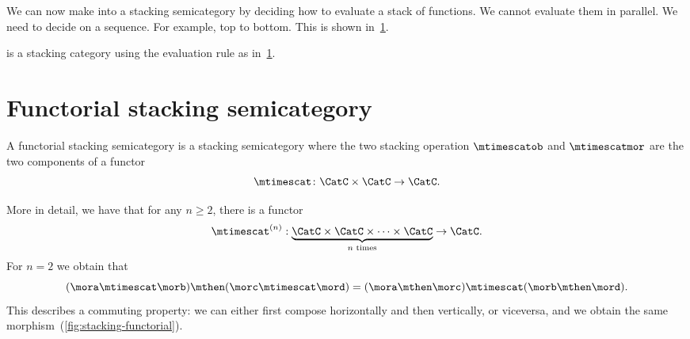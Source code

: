 We can now make \Effects into a stacking semicategory by deciding how to evaluate a stack of functions.
We cannot evaluate them in parallel.
We need to decide on a sequence.
For example, top to bottom.
This is shown in~\cref{fig:effect-stacking}.

\begin{lemma}
    \label{lem:effects-is-stacking}
    \Effects is a stacking category using the evaluation rule as in~\cref{fig:effect-stacking}.
\end{lemma}

\begin{figure}[h!]
    \centering
    \caption{}
    \label{fig:effect-stacking}
\end{figure}


\section{Functorial stacking semicategory}

\begin{ctdefinition}
    \label{def:functorial-stacking-semi-cat}
    A functorial stacking semicategory is a stacking semicategory where the two stacking operation $\mtimescatob$ and $\mtimescatmor$ are the two components of a functor
    \begin{equation}
        \mtimescat\colon \CatC \times \CatC \to \CatC.
    \end{equation}
\end{ctdefinition}

More in detail, we have that for any $n \geq 2$, there is a functor
%
\begin{equation}
    \mtimescat^{(n)}: \underbrace {\CatC \times \CatC \times \cdots \times \CatC}_{\text{$n$ times}} \to \CatC.
\end{equation}
%
For $n=2$ we obtain that
%
\begin{equation}
    (\mora \mtimescat \morb )
    \mthen (\morc \mtimescat \mord )
    =
    (\mora \mthen \morc ) \mtimescat (\morb \mthen \mord ).
\end{equation}
%
This describes a commuting property: we can either first compose horizontally and then vertically, or viceversa, and we obtain the same morphism~(\cref{fig:stacking-functorial}).

